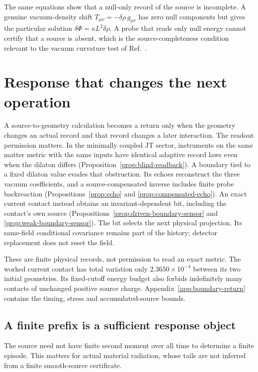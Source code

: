 \documentclass[12pt,a4paper]{article}
\begin{document}
The same equations show that a null-only record of the source is incomplete. A genuine vacuum-density shift $T_{\mu\nu}=-\delta\rho\,g_{\mu\nu}$ has zero null components but gives the particular solution $\delta\Phi=\kappa L^2\delta\rho$. A probe that reads only null energy cannot certify that a source is absent, which is the source-completeness condition relevant to the vacuum curvature test of Ref.~\cite{QRNV}.


\section{Response that changes the next operation}
\label{sec:physical-return}

A source-to-geometry calculation becomes a return only when the geometry
changes an actual record and that record changes a later interaction.
The readout permission matters. In the minimally coupled JT sector,
instruments on the same matter metric with the same inputs have identical
adaptive record laws even when the dilaton differs
(Proposition~\ref{prop:blind-readback}). A boundary tied to a fixed dilaton
value evades that obstruction. Its echoes reconstruct the three vacuum
coefficients, and a source-compensated inverse includes finite probe
backreaction (Propositions~\ref{prop:echo} and
\ref{prop:compensated-echo}). An exact current contact instead obtains an
invariant-dependent bit, including the contact's own source
(Propositions~\ref{prop:driven-boundary-sensor} and
\ref{prop:weak-boundary-sensor}). The bit selects the next physical
projection. Its same-field conditional covariance remains part of the
history; detector replacement does not reset the field.

These are finite physical records, not permission to read an exact metric.
The worked current contact has total variation only
$2.3650\times10^{-4}$ between its two initial geometries.
Its fixed-cutoff energy budget also forbids indefinitely many contacts of
unchanged positive source charge. Appendix~\ref{app:boundary-return}
contains the timing, stress and accumulated-source bounds.

\subsection{A finite prefix is a sufficient response object}

The source need not have finite second moment over all time to determine a
finite episode. This matters for actual material radiation, whose tails
are not inferred from a finite smooth-source certificate.
\end{document}
